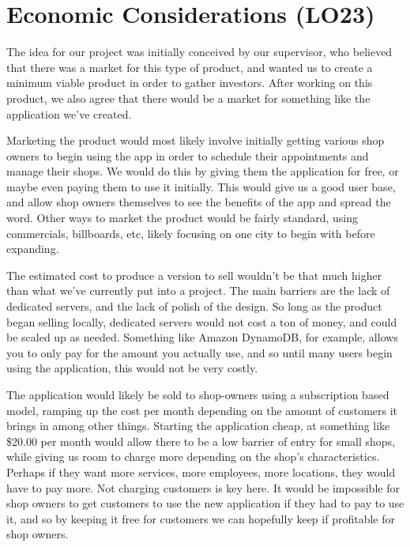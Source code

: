 \documentclass{article}
\begin{document}
\section{Economic Considerations (LO23)}


The idea for our project was initially conceived by our supervisor, who believed that there was a market for this type of product, and wanted us to create a minimum viable product in order to gather investors. After working on this product, we also agree that there would be a market for something like the application we've created.

Marketing the product would most likely involve initially getting various shop owners to begin using the app in order to schedule their appointments and manage their shops. We would do this by giving them the application for free, or maybe even paying them to use it initially. This would give us a good user base, and allow shop owners themselves to see the benefits of the app and spread the word. Other ways to market the product would be fairly standard, using commercials, billboards, etc, likely focusing on one city to begin with before expanding.

The estimated cost to produce a version to sell wouldn't be that much higher than what we've currently put into a project. The main barriers are the lack of dedicated servers, and the lack of polish of the design. So long as the product began selling locally, dedicated servers would not cost a ton of money, and could be scaled up as needed. Something like Amazon DynamoDB, for example, allows you to only pay for the amount you actually use, and so until many users begin using the application, this would not be very costly.

The application would likely be sold to shop-owners using a subscription based model, ramping up the cost per month depending on the amount of customers it brings in among other things. Starting the application cheap, at something like \$20.00 per month would allow there to be a low barrier of entry for small shops, while giving us room to charge more depending on the shop's characteristics. Perhaps if they want more services, more employees, more locations, they would have to pay more. Not charging customers is key here. It would be impossible for shop owners to get customers to use the new application if they had to pay to use it, and so by keeping it free for customers we can hopefully keep if profitable for shop owners.
\end{document}
